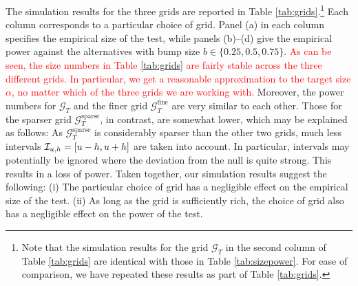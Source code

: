 \documentclass[12pt]{article}
\begin{document}
The simulation results for the three grids are reported in Table \ref{tab:grids}.\footnote{Note that the simulation results for the grid $\mathcal{G}_T$ in the second column of Table \ref{tab:grids} are identical with those in Table \ref{tab:sizepower}. For ease of comparison, we have repeated these results as part of Table \ref{tab:grids}.}
Each column corresponds to a particular choice of grid. Panel (a) in each column specifies the empirical size of the test, while panels (b)--(d) give the empirical power against the alternatives with bump size $b \in \{0.25,0.5,0.75\}$. 
\textcolor{red}{As can be seen, the size numbers in Table \ref{tab:grids} are fairly stable across the three different grids. In particular, we get a reasonable approximation to the target size $\alpha$, no matter which of the three grids we are working with.} 
Moreover, the power numbers for $\mathcal{G}_T$ and the finer grid $\mathcal{G}_T^{\text{fine}}$ are very similar to each other. Those for the sparser grid $\mathcal{G}_T^{\text{sparse}}$, in contrast, are somewhat lower, which may be explained as follows: As $\mathcal{G}_T^{\text{sparse}}$ is considerably sparser than the other two grids, much less intervals $\mathcal{I}_{u, h} = [u-h,u+h]$ are taken into account. In particular, intervals may potentially be ignored where the deviation from the null is quite strong. This results in a loss of power.
Taken together, our simulation results suggest the following: (i) The particular choice of grid has a negligible effect on the empirical size of the test. (ii) As long as the grid is sufficiently rich, the choice of grid also has a negligible effect on the power of the test. 
\end{document}
